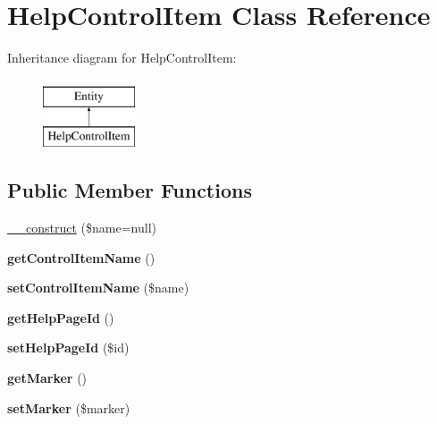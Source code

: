 \hypertarget{classHelpControlItem}{
\section{HelpControlItem Class Reference}
\label{classHelpControlItem}
}
Inheritance diagram for HelpControlItem:\begin{figure}[H]
\begin{center}
\leavevmode
\includegraphics[height=2.000000cm]{classHelpControlItem}
\end{center}
\end{figure}
\subsection*{Public Member Functions}
\begin{DoxyCompactItemize}
\item 
\hyperlink{classHelpControlItem_ad68f3352da05584a2b8abc532a35f1b3}{\_\-\_\-construct} (\$name=null)
\item 
\hypertarget{classHelpControlItem_a65737f65019bacb4ce4bb414164aa039}{
{\bfseries getControlItemName} ()}
\label{classHelpControlItem_a65737f65019bacb4ce4bb414164aa039}

\item 
\hypertarget{classHelpControlItem_ad81b2bf57e0bffadac883e9a9ef0eab3}{
{\bfseries setControlItemName} (\$name)}
\label{classHelpControlItem_ad81b2bf57e0bffadac883e9a9ef0eab3}

\item 
\hypertarget{classHelpControlItem_aa9383760a9c844e2cfb4f0f7925bc744}{
{\bfseries getHelpPageId} ()}
\label{classHelpControlItem_aa9383760a9c844e2cfb4f0f7925bc744}

\item 
\hypertarget{classHelpControlItem_aae05fa5d3f7ab4973f60fbae155cf463}{
{\bfseries setHelpPageId} (\$id)}
\label{classHelpControlItem_aae05fa5d3f7ab4973f60fbae155cf463}

\item 
\hypertarget{classHelpControlItem_aa764ce4d529d45c11870a160c2866576}{
{\bfseries getMarker} ()}
\label{classHelpControlItem_aa764ce4d529d45c11870a160c2866576}

\item 
\hypertarget{classHelpControlItem_af4e0dc1d80c0b08797df1ef294262cdf}{
{\bfseries setMarker} (\$marker)}
\label{classHelpControlItem_af4e0dc1d80c0b08797df1ef294262cdf}

\end{DoxyCompactItemize}
